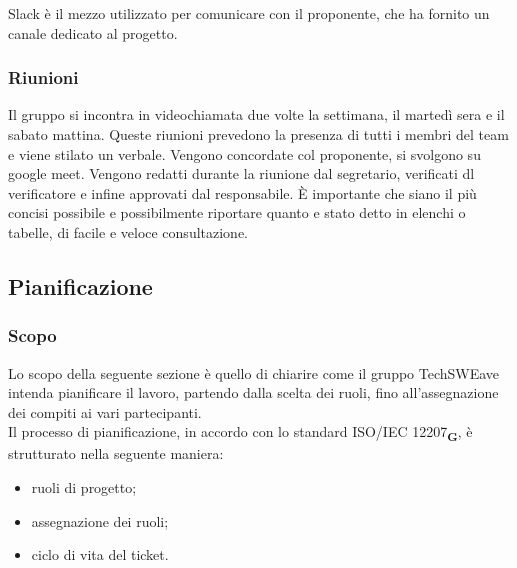 Slack \`e il mezzo utilizzato per comunicare con il proponente, che ha fornito un canale dedicato al progetto.
\subsubsection{Riunioni}
Il gruppo si incontra in videochiamata due volte la settimana, il marted\`i sera e il sabato mattina. Queste riunioni prevedono la presenza di tutti i membri del team e viene stilato un verbale.
Vengono concordate col proponente, si svolgono su google meet.
Vengono redatti durante la riunione dal segretario, verificati dl verificatore e infine approvati dal responsabile. \`E importante che siano il pi\`u concisi possibile e possibilmente riportare quanto e stato detto in elenchi o tabelle, di facile e veloce consultazione.
\subsection{Pianificazione}
\subsubsection{Scopo}
Lo scopo della seguente sezione è quello di chiarire come il gruppo TechSWEave intenda pianificare il lavoro, partendo dalla scelta dei ruoli, fino all'assegnazione dei compiti ai vari partecipanti.\\
Il processo di pianificazione, in accordo con lo standard ISO/IEC 12207\textsubscript{\textbf{G}}, è strutturato nella seguente maniera:
\begin {itemize}
    \item ruoli di progetto;
    \item assegnazione dei ruoli;
    \item ciclo di vita del ticket.
\end {itemize}
